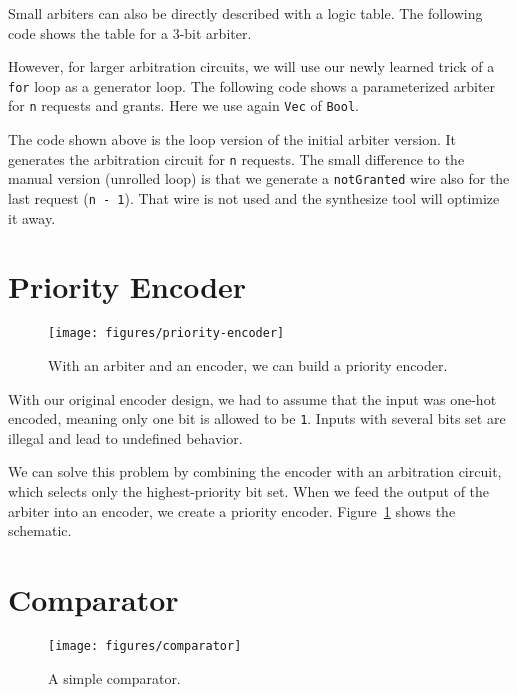 \documentclass[%
    10pt,
    headinclude, footexclude,
    openright, %
    notitlepage,
    cleardoubleempty,
    headsepline,
    pointlessnumbers,
    bibtotoc, idxtotoc,
    ]{scrbook}
\newcommand{\scale}{0.7}
\newcommand{\code}[1]{{\lstinline[basicstyle=\small\ttfamily]{#1}}}
\newcommand{\todo}[1]{{\emph{TODO: #1}}}
\renewcommand{\todo}[1]{}
\begin{document}
Small arbiters can also be directly described with a logic table. The following code
shows the table for a 3-bit arbiter.


\todo{Maybe also use the pattern matching with ??? in Chisel}

However, for larger arbitration circuits, we will use our newly learned trick of
a \code{for} loop as a generator loop. The following code shows a parameterized
arbiter for \code{n} requests and grants. Here we use again \code{Vec} of \code{Bool}.


\noindent The code shown above is the loop version of the initial arbiter version.
It generates the arbitration circuit for \code{n} requests. The small difference to the
manual version (unrolled loop) is that we generate a \code{notGranted} wire also for the
last request (\code{n - 1}). That wire is not used and the synthesize tool will optimize it away.



\section{Priority Encoder}


\begin{figure}
  \centering
  \texttt{[image: figures/priority-encoder]}
  \caption{With an arbiter and an encoder, we can build a priority encoder.}
  \label{fig:priority-encoder}
\end{figure}

With our original encoder design, we had to assume that the input was one-hot
encoded, meaning only one bit is allowed to be \code{1}. Inputs with several
bits set are illegal and lead to undefined behavior.

We can solve this problem by combining the encoder with an arbitration circuit, which selects only
the highest-priority bit set. When we feed the output of the arbiter into an encoder,
we create a priority encoder.
Figure~\ref{fig:priority-encoder} shows the schematic.


\section{Comparator}

\begin{figure}
  \centering
  \texttt{[image: figures/comparator]}
  \caption{A simple comparator.}
  \label{fig:comparator}
\end{figure}
\end{document}
